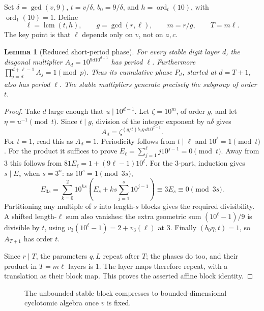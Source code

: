 \documentclass[10pt]{article}
\newtheorem{lemma}{Lemma}
\DeclareMathOperator{\ord}{ord}
\begin{document}
Set \(\delta=\gcd(v,9)\), \(t=v/\delta\),
\(b_0=9/\delta\), and \(h=\ord_t(10)\), with \(\ord_1(10)=1\).
Define
\[
\ell=\operatorname{lcm}(t,h),\qquad
g=\gcd(r,\ell),\qquad m=r/g,\qquad T=m\ell.
\]
The key point is that \(\ell\) depends only on \(v\), not on \(a,c\).

\begin{lemma}[Reduced short-period phase]\label{lem:phase}
For every stable digit layer \(d\), the diagonal multiplier
\(A_d=10^{9d10^{d-1}}\) has period \(\ell\).
Furthermore \(\prod_{j=d}^{d+\ell-1}A_j=1\pmod p\).
Thus its cumulative phase \(P_d\), started at \(d=T+1\),
also has period \(\ell\). The stable multipliers generate precisely
the subgroup of order \(t\).
\end{lemma}
\begin{proof}
Take \(d\) large enough that \(u\mid10^{d-1}\).
Let \(\zeta=10^m\), of order \(g\), and let
\(\eta=u^{-1}\pmod t\). Since \(t\mid g\), division of the
integer exponent by \(u\delta\) gives
\[
A_d=\zeta^{(g/t)b_0\eta\,d10^{d-1}}.
\]
For \(t=1\), read this as \(A_d=1\).
Periodicity follows from \(t\mid\ell\) and \(10^\ell=1\pmod t\).
For the product it suffices to prove
\(E_\ell=\sum_{j=1}^{\ell}j10^{j-1}=0\pmod t\).
Away from 3 this follows from
\(81E_\ell=1+(9\ell-1)10^\ell\).
For the 3-part, induction gives \(s\mid E_s\) when \(s=3^n\):
as \(10^s=1\pmod{3s}\),
\[
E_{3s}=\sum_{k=0}^2 10^{ks}
 \left(E_s+ks\sum_{j=1}^s10^{j-1}\right)
 \equiv3E_s\equiv0\pmod{3s}.
\]
Partitioning any multiple of \(s\) into length-\(s\) blocks gives
the required divisibility. A shifted length-\(\ell\) sum also
vanishes: the extra geometric sum \((10^\ell-1)/9\) is divisible
by \(t\), using \(v_3(10^\ell-1)=2+v_3(\ell)\) at 3.
Finally \((b_0\eta,t)=1\), so \(A_{T+1}\) has order \(t\).

Since \(r\mid T\), the parameters \(q,L\) repeat after \(T\);
the phases do too, and their product in \(T=m\ell\) layers is 1.
The layer maps therefore repeat, with a translation as their block
map. This proves the asserted affine block identity.
\end{proof}

\begin{figure}[h]
\centering
{}
\caption{The unbounded stable block compresses to bounded-dimensional
cyclotomic algebra once \(v\) is fixed.}
\end{figure}
\end{document}
